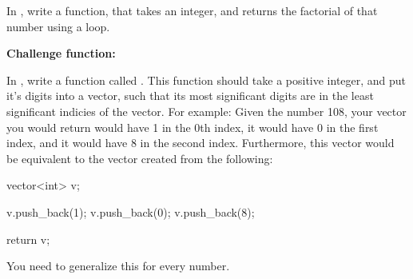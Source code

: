 \documentclass{tufte-handout}
\begin{document}
\medskip \noindent
\textbf{}
\medskip

\noindent In , write a function,  that takes an integer, and returns the factorial of that number using a loop.  

\medskip \noindent
\textbf{Challenge function: }
\medskip

\noindent In , write a function called .
This function should take a positive integer, and put it's digits into a vector, such that its most significant digits are in the least significant indicies of the vector. \newline
For example: Given the number 108, your vector you would return would have 1 in the 0th index, it would have 0 in the first index, and it would have 8 in the second index.
Furthermore, this vector would be equivalent to the vector created from the following:
\begin{Code}
vector<int> v;

v.push_back(1);
v.push_back(0);
v.push_back(8);

return v;
\end{Code}
You need to generalize this for every number.
\end{document}
